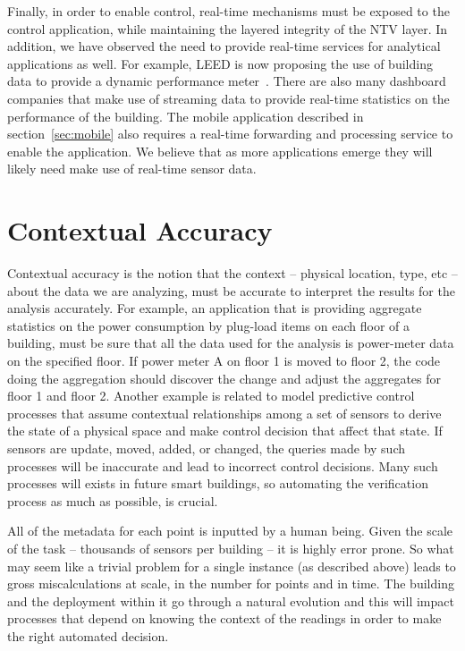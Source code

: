 Finally, in order to enable control, real-time mechanisms must be exposed to the control application, while maintaining the 
layered integrity of the NTV layer.  In addition, we have observed the need to provide real-time services for analytical applications
as well.  For example, LEED is now proposing the use of building data to provide a dynamic performance meter~\cite{DynamicLeed}.
There are also many dashboard companies that make use of streaming data to provide real-time statistics on the performance of the
building.  The mobile application described in section~\ref{sec:mobile} also requires a real-time forwarding and processing service to
enable the application.  We believe that as more applications emerge they will likely need make use of real-time sensor data.

\section{Contextual Accuracy}
Contextual accuracy is the notion that the context -- physical location, type, etc -- about the data we are analyzing, must be accurate
to interpret the results for the analysis accurately.  For example, an application that is providing aggregate statistics on the 
power consumption by plug-load items on each floor of a building, must be sure that all the data used for the analysis 
is power-meter data on the specified floor.  If power meter A on floor 1 is moved to floor 2, the code doing the aggregation
should discover the change and adjust the aggregates for floor 1 and floor 2.  Another example is related to model predictive 
control processes that assume contextual relationships among a set of sensors to derive the state of a physical space and 
make control decision that affect that state.  If sensors are update, moved, added, or changed, the queries made by such processes
will be inaccurate and lead to incorrect control decisions.  Many such processes will exists in future smart buildings, so
automating the verification process as much as possible, is crucial.

All of the metadata for each point is inputted by a human being.  Given the scale of the task -- thousands of sensors per building --
it is highly error prone.  So what may seem like a trivial problem for a single instance (as described above) leads to gross
miscalculations at scale, in the number for points and in time.  The building and the deployment within it go through a natural
evolution and this will impact processes that depend on knowing the context of the readings in order to make the right automated decision.

